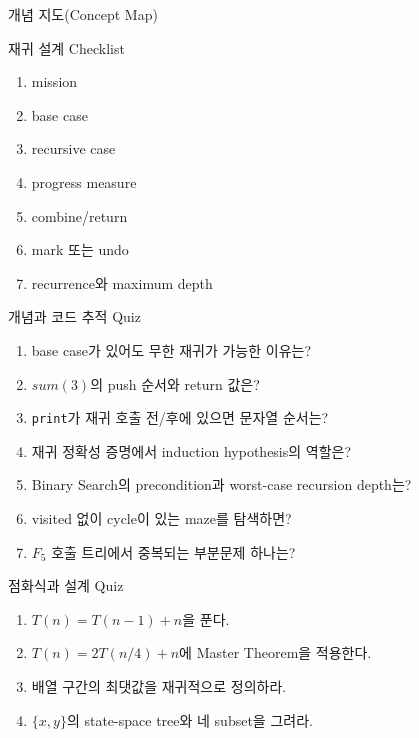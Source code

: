 \begin{frame}{개념 지도(Concept Map)}\centering{}
\end{frame}
\begin{frame}{재귀 설계 Checklist}\begin{enumerate}\item mission\item base case\item recursive case\item progress measure\item combine/return\item mark 또는 undo\item recurrence와 maximum depth\end{enumerate}
\end{frame}
\begin{frame}{개념과 코드 추적 Quiz}\small
\begin{enumerate}
  \item base case가 있어도 무한 재귀가 가능한 이유는?
  \item $sum(3)$의 push 순서와 return 값은?
  \item \texttt{print}가 재귀 호출 전/후에 있으면 문자열 순서는?
  \item 재귀 정확성 증명에서 induction hypothesis의 역할은?
  \item Binary Search의 precondition과 worst-case recursion depth는?
  \item visited 없이 cycle이 있는 maze를 탐색하면?
  \item $F_5$ 호출 트리에서 중복되는 부분문제 하나는?
\end{enumerate}
\end{frame}
\begin{frame}{점화식과 설계 Quiz}\small\begin{enumerate}\item $T(n)=T(n-1)+n$을 푼다.\item $T(n)=2T(n/4)+n$에 Master Theorem을 적용한다.\item 배열 구간의 최댓값을 재귀적으로 정의하라.\item $\{x,y\}$의 state-space tree와 네 subset을 그려라.\end{enumerate}
\end{frame}
